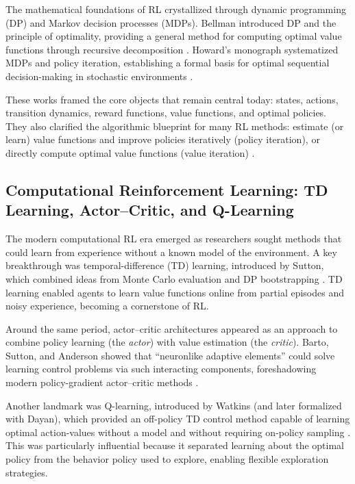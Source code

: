 \documentclass[unnumsec,webpdf,contemporary,large]{oup-authoring-template}
\theoremstyle{thmstyleone}
\theoremstyle{thmstyletwo}
\theoremstyle{thmstylethree}
\begin{document}
The mathematical foundations of RL crystallized through dynamic programming (DP) and Markov decision processes (MDPs).
Bellman introduced DP and the principle of optimality, providing a general method for computing optimal value functions through recursive decomposition \cite{bellman1957dynamic}.
Howard's monograph systematized MDPs and policy iteration, establishing a formal basis for optimal sequential decision-making in stochastic environments \cite{howard1960dynamic}.

These works framed the core objects that remain central today: states, actions, transition dynamics, reward functions, value functions, and optimal policies.
They also clarified the algorithmic blueprint for many RL methods: estimate (or learn) value functions and improve policies iteratively (policy iteration), or directly compute optimal value functions (value iteration) \cite{bellman1957dynamic,howard1960dynamic}.

\subsection{Computational Reinforcement Learning: TD Learning, Actor--Critic, and Q-Learning}

The modern computational RL era emerged as researchers sought methods that could learn from experience without a known model of the environment.
A key breakthrough was temporal-difference (TD) learning, introduced by Sutton, which combined ideas from Monte Carlo evaluation and DP bootstrapping \cite{sutton1988td}.
TD learning enabled agents to learn value functions online from partial episodes and noisy experience, becoming a cornerstone of RL.

Around the same period, actor--critic architectures appeared as an approach to combine policy learning (the \emph{actor}) with value estimation (the \emph{critic}).
Barto, Sutton, and Anderson showed that ``neuronlike adaptive elements'' could solve learning control problems via such interacting components, foreshadowing modern policy-gradient actor--critic methods \cite{barto1983neuronlike}.

Another landmark was Q-learning, introduced by Watkins (and later formalized with Dayan), which provided an off-policy TD control method capable of learning optimal action-values without a model and without requiring on-policy sampling \cite{watkins1989thesis,watkins1992qlearning}.
This was particularly influential because it separated learning about the optimal policy from the behavior policy used to explore, enabling flexible exploration strategies.
\end{document}
